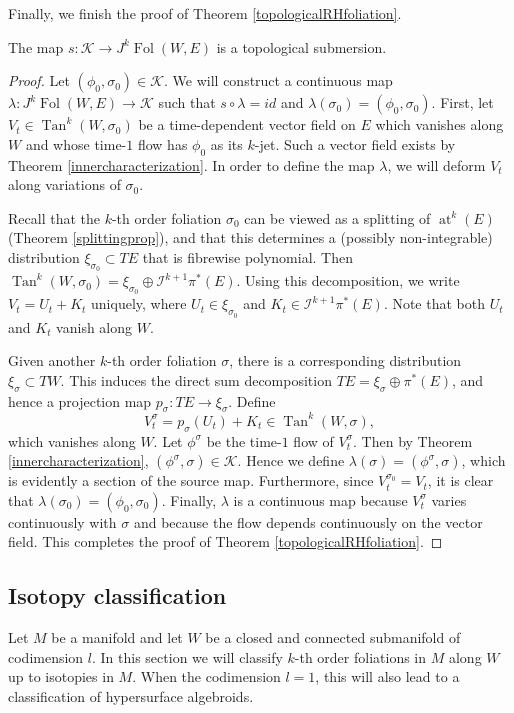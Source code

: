 \documentclass[10pt]{amsart}
\newcommand{\FolObj}{{\operatorname{Fol}}}
\newcommand{\Tan}{{\operatorname{Tan}}}
\DeclareMathOperator{\at}{at}
\numberwithin{theoremalpha}{section}
\numberwithin{equation}{section}
\numberwithin{definition}{section}
\numberwithin{theorem}{section}
\numberwithin{proposition}{section}
\numberwithin{lemma}{section}
\numberwithin{example}{section}
\numberwithin{remark}{section}
\numberwithin{corollary}{section}
\numberwithin{question}{section}
\numberwithin{problem}{section}
\numberwithin{assumption}{section}
\theoremstyle{named}
\numberwithin{equation}{section}
\begin{document}
Finally, we finish the proof of Theorem \ref{topologicalRHfoliation}.
\begin{lemma}
The map $s: \mathcal{K} \to J^k\FolObj(W,E)$ is a topological submersion. 
\end{lemma} 
\begin{proof}
Let $(\phi_0, \sigma_0) \in \mathcal{K}$. We will construct a continuous map $\lambda : J^k\FolObj(W,E) \to \mathcal{K}$ such that $s \circ \lambda = id$ and $\lambda(\sigma_0) = (\phi_0, \sigma_0)$. First, let $V_{t} \in \Tan^{k}(W, \sigma_0)$ be a time-dependent vector field on $E$ which vanishes along $W$ and whose time-$1$ flow has $\phi_0$ as its $k$-jet. Such a vector field exists by Theorem \ref{innercharacterization}. In order to define the map $\lambda$, we will deform $V_{t}$ along variations of $\sigma_{0}$. 

Recall that the $k$-th order foliation $\sigma_0$ can be viewed as a splitting of $\at^{k}(E)$ (Theorem \ref{splittingprop}), and that this determines a (possibly non-integrable) distribution $\xi_{\sigma_0} \subset TE$ that is fibrewise polynomial. Then $\Tan^{k}(W, \sigma_0) = \xi_{\sigma_0} \oplus \mathcal{I}^{k+1} \pi^*(E)$. Using this decomposition, we write $V_{t} = U_{t} + K_{t}$ uniquely, where $U_{t} \in \xi_{\sigma_{0}}$ and $K_{t} \in \mathcal{I}^{k+1} \pi^*(E)$. Note that both $U_{t}$ and $K_{t}$ vanish along $W$. 

Given another $k$-th order foliation $\sigma$, there is a corresponding distribution $\xi_{\sigma} \subset TW$. This induces the direct sum decomposition $TE = \xi_{\sigma} \oplus \pi^*(E)$, and hence a projection map $p_{\sigma} : TE \to \xi_{\sigma}$. Define 
\[ V_{t}^\sigma = p_{\sigma}(U_{t}) + K_{t} \in \Tan^{k}(W, \sigma), \]
which vanishes along $W$. Let $\phi^{\sigma}$ be the time-$1$ flow of $V_{t}^\sigma$. Then by Theorem \ref{innercharacterization}, $(\phi^{\sigma}, \sigma) \in \mathcal{K}$. Hence we define $\lambda(\sigma) = (\phi^{\sigma}, \sigma)$, which is evidently a section of the source map. Furthermore, since $V_{t}^{\sigma_{0}} = V_{t}$, it is clear that $\lambda(\sigma_{0}) = (\phi_{0}, \sigma_{0})$. Finally, $\lambda$ is a continuous map because $V_{t}^\sigma$ varies continuously with $\sigma$ and because the flow depends continuously on the vector field. This completes the proof of Theorem \ref{topologicalRHfoliation}.
\end{proof}

\subsection{Isotopy classification} \label{Isotopy}
Let $M$ be a manifold and let $W$ be a closed and connected submanifold of codimension $l$. In this section we will classify $k$-th order foliations in $M$ along $W$ up to isotopies in $M$. When the codimension $l = 1$, this will also lead to a classification of hypersurface algebroids. 
\end{document}
